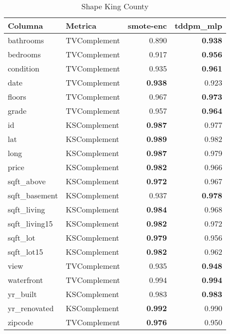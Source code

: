 \begin{table}[H]
\centering
\caption{Shape King County}
\label{table-shape-king county-a-2}
\begin{tabular}{|l|l|r|r|}
\hline
\rowcolor[gray]{0.8}
Columna & Metrica & smote-enc & tddpm\_mlp \\
\hline bathrooms & TVComplement & 0.890 & \bfseries 0.938 \\
\hline bedrooms & TVComplement & 0.917 & \bfseries 0.956 \\
\hline condition & TVComplement & 0.935 & \bfseries 0.961 \\
\hline date & TVComplement & \bfseries 0.938 & 0.923 \\
\hline floors & TVComplement & 0.967 & \bfseries 0.973 \\
\hline grade & TVComplement & 0.957 & \bfseries 0.964 \\
\hline id & KSComplement & \bfseries 0.987 & 0.977 \\
\hline lat & KSComplement & \bfseries 0.989 & 0.982 \\
\hline long & KSComplement & \bfseries 0.987 & 0.979 \\
\hline price & KSComplement & \bfseries 0.982 & 0.966 \\
\hline sqft\_above & KSComplement & \bfseries 0.972 & 0.967 \\
\hline sqft\_basement & KSComplement & 0.937 & \bfseries 0.978 \\
\hline sqft\_living & KSComplement & \bfseries 0.984 & 0.968 \\
\hline sqft\_living15 & KSComplement & \bfseries 0.982 & 0.972 \\
\hline sqft\_lot & KSComplement & \bfseries 0.979 & 0.956 \\
\hline sqft\_lot15 & KSComplement & \bfseries 0.982 & 0.962 \\
\hline view & TVComplement & 0.935 & \bfseries 0.948 \\
\hline waterfront & TVComplement & 0.994 & \bfseries 0.994 \\
\hline yr\_built & KSComplement & 0.983 & \bfseries 0.983 \\
\hline yr\_renovated & KSComplement & \bfseries 0.992 & 0.990 \\
\hline zipcode & TVComplement & \bfseries 0.976 & 0.950 \\
\hline
\end{tabular}
\end{table}
